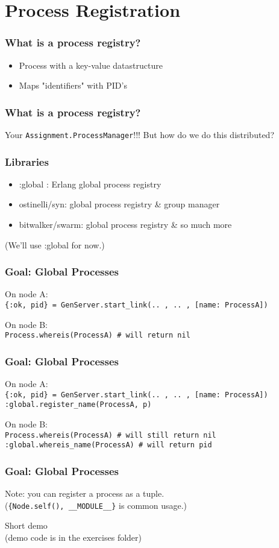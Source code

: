 \section{Process Registration}

\frame{\tableofcontents[currentsection]}

\begin{frame}
    \frametitle{What is a process registry?}
    \begin{itemize}
        \item Process with a key-value datastructure 
        \item Maps "identifiers" with PID's
    \end{itemize}
\end{frame}

\begin{frame}
    \frametitle{What is a process registry?}
    Your \texttt{Assignment.ProcessManager}!!! %
    \vfill
    But how do we do this distributed?
\end{frame}

\begin{frame}
    \frametitle{Libraries}
    \begin{itemize}
        \item :global : Erlang global process registry
        \item ostinelli/syn: global process registry \& group manager
        \item bitwalker/swarm: global process registry \& so much more
    \end{itemize}
    
    \vfill

    (We'll use :global for now.)
\end{frame}

\begin{frame}
    \frametitle{Goal: Global Processes}
    On node A: \\
    \texttt{\{:ok, pid\} = GenServer.start\_link(.. , .. , [name: ProcessA])} 

    \vfill

    On node B: \\
    \texttt{Process.whereis(ProcessA) \# will return nil} 
\end{frame}

\begin{frame}
    \frametitle{Goal: Global Processes}
    On node A: \\
    \texttt{\{:ok, pid\} = GenServer.start\_link(.. , .. , [name: ProcessA])} \\
    \texttt{:global.register\_name(ProcessA, p)}

    \vfill

    On node B: \\
    \texttt{Process.whereis(ProcessA) \# will still return nil} \\ 
    \texttt{:global.whereis\_name(ProcessA) \# will return pid} \\ 
\end{frame}

\begin{frame}
    \frametitle{Goal: Global Processes}
    Note: you can register a process as a tuple. \\ 
    (\texttt{\{Node.self(), \_\_MODULE\_\_\}} is common usage.)

    \vfill

    Short demo\\
    \tiny{(demo code is in the exercises folder)}
\end{frame}
